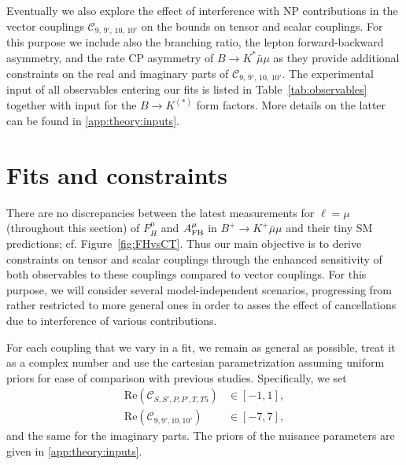 \documentclass[twocolumn,epjc3]{svjour3}
\numberwithin{equation}{section}
\def \refapp#1{\ref{#1}}
\def \reffig#1{Figure~\ref{#1}}
\def \reftab#1{Table~\ref{#1}}
\def \nn{\nonumber\\}
\newcommand{\checked}[1]{{\color{brown}{ {\bf Checked: }{#1}}}}
\renewcommand{\checked}[1]{#1}
\newcommand{\wilson}[2][{}]{\mathcal{C}_{#2}^{\mathrm{#1}}}
\renewcommand{\[}{\big[}
\renewcommand{\]}{\big]}
\renewcommand{\(}{\big(}
\renewcommand{\)}{\big)}
\begin{document}
Eventually we also explore the effect of interference with {NP contributions}
in the vector couplings $\wilson{9,\,9',\,10,\,10'}$ on the bounds
on tensor and scalar couplings.  For this purpose we include also the branching
ratio, the lepton forward-backward asymmetry, and the rate CP asymmetry of
$B\to K^* \bar\mu\mu$ as they provide additional constraints on the real and
imaginary parts of $\wilson{9,\,9',\,10,\,10'}$. The experimental {input} of all
observables entering our fits is listed in \reftab{tab:observables} together with input for
the $B\to K^{(*)}$ form factors. More details on the latter can be found in
\refapp{app:theory:inputs}.

%
%
%
\section{
  \checked{Fits and constraints}
  \label{sec:results}
}

There are no discrepancies between the latest measurements for $\ell = \mu$
(throughout this section) of $F_H^\mu$ and $A_{\rm FB}^\mu$ in $B^+ \to K^+
\bar\mu\mu$ and their tiny SM predictions; cf. \reffig{fig:FHvsCT}. Thus our
main objective is to derive constraints on tensor and scalar couplings through
the enhanced sensitivity of both observables to {these} couplings compared to
vector couplings. For this purpose, we will consider several model-independent
scenarios, progressing from rather restricted to more general ones in order to
asses the effect of cancellations due to interference of various contributions.

For each coupling {that} we vary in a fit, we remain as general as possible, treat it
as a complex number and use the cartesian parametrization assuming uniform
priors for ease of comparison with previous studies. Specifically, we set
\begin{align}
  \label{eq:wilson-prior}
  \mbox{Re}(\wilson{S,S',P,P',T,T5}) &\in [-1, 1],\nn \mbox{Re}(\wilson{9,9',10,10'}) &\in [-7, 7],
\end{align}
and the same for the imaginary parts. The priors of the nuisance parameters are given in \refapp{app:theory:inputs}.
\end{document}
